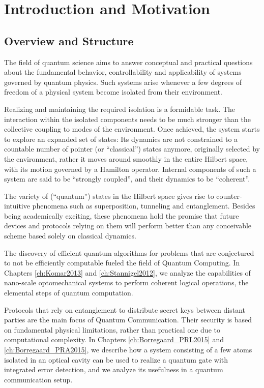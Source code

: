 \chapter{Introduction and Motivation}

\section{Overview and Structure}
The field of quantum science aims to answer conceptual and practical questions
about the fundamental behavior, controllability and applicability of 
systems governed by quantum physics. Such systems arise whenever a few 
degrees of freedom of a physical system become isolated from their environment. 

Realizing and maintaining the required isolation is a formidable
task. The interaction within the isolated components needs to be
much stronger than the collective coupling to modes of the environment.
Once achieved, the system starts to explore an expanded set of states: Its
dynamics are not constrained to a countable number of pointer (or
``classical'') states anymore, originally selected by the environment, rather it
moves around smoothly in the entire Hilbert space, with its motion governed by a
Hamilton operator. Internal components of such a system are said to be ``strongly
coupled'', and their dynamics to be ``coherent''.

The variety of (``quantum'') states in the Hilbert space  gives rise
to counter-intuitive phenomena such as superposition, tunneling and
entanglement.
Besides being academically exciting, these phenomena hold the promise that
future devices and protocols relying on them will perform better than any
conceivable scheme based solely on classical dynamics. 

The discovery of
efficient quantum algorithms for problems that are conjectured to not be
efficiently computable fueled the field of Quantum Computing. In Chapters
\ref{ch:Komar2013} and \ref{ch:Stannigel2012}, we analyze the
capabilities of nano-scale optomechanical systems to perform coherent logical
operations, the elemental steps of quantum computation.

Protocols that rely on entanglement to distribute secret keys between distant
parties are the main focus of Quantum Communication. Their security is based on
fundamental physical limitations, rather than practical one due to
computational complexity.
In Chapters \ref{ch:Borregaard_PRL2015} and \ref{ch:Borregaard_PRA2015}, we
describe how a system consisting of a few atoms isolated in an optical cavity
can be used to realize a quantum gate with integrated error detection, and we
analyze its usefulness in a quantum communication setup.

